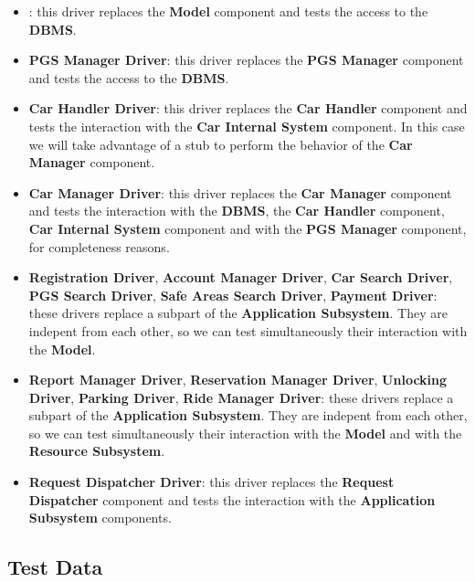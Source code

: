 \documentclass[english]{article}
\begin{document}
\begin{itemize}
	\item{: this driver replaces the \textbf{Model} component and tests the access to the \textbf{DBMS}.}
	
	\item{\textbf{PGS Manager Driver}: this driver replaces the \textbf{PGS Manager} component and tests the access to the \textbf{DBMS}.}
	
	\item{\textbf{Car Handler Driver}: this driver replaces the \textbf{Car Handler} component and tests the interaction with the \textbf{Car Internal System} component. In this case we will take advantage of a stub to perform the behavior of the \textbf{Car Manager} component.}
	
	\item{\textbf{Car Manager Driver}: this driver replaces the \textbf{Car Manager} component and tests the interaction with the \textbf{DBMS}, the \textbf{Car Handler} component, \textbf{Car Internal System} component and with the \textbf{PGS Manager} component, for completeness reasons.}

	\item{\textbf{Registration Driver}, \textbf{Account Manager Driver}, \textbf{Car Search Driver}, \textbf{PGS Search Driver}, \textbf{Safe Areas Search Driver}, \textbf{Payment Driver}: these drivers replace a subpart of the \textbf{Application Subsystem}. They are indepent from each other, so we can test simultaneously their interaction with the \textbf{Model}.}

	\item{\textbf{Report Manager Driver}, \textbf{Reservation Manager Driver}, \textbf{Unlocking Driver}, \textbf{Parking Driver}, \textbf{Ride Manager Driver}: these drivers replace a subpart of the \textbf{Application Subsystem}. They are indepent from each other, so we can test simultaneously their interaction with the \textbf{Model} and with the \textbf{Resource Subsystem}.}

	\item{\textbf{Request Dispatcher Driver}: this driver replaces the \textbf{Request Dispatcher} component and tests the interaction with the \textbf{Application Subsystem} components.}

\end{itemize}
\subsection{Test Data}
 
\end{document}
